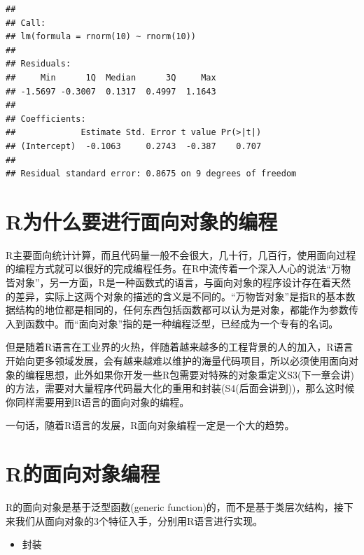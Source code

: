 \documentclass[]{book}
\providecommand{\tightlist}{%
  \setlength{\itemsep}{0pt}\setlength{\parskip}{0pt}}
\begin{document}
\begin{verbatim}
## 
## Call:
## lm(formula = rnorm(10) ~ rnorm(10))
## 
## Residuals:
##     Min      1Q  Median      3Q     Max 
## -1.5697 -0.3007  0.1317  0.4997  1.1643 
## 
## Coefficients:
##             Estimate Std. Error t value Pr(>|t|)
## (Intercept)  -0.1063     0.2743  -0.387    0.707
## 
## Residual standard error: 0.8675 on 9 degrees of freedom
\end{verbatim}

\section{R为什么要进行面向对象的编程}\label{r}

R主要面向统计计算，而且代码量一般不会很大，几十行，几百行，使用面向过程的编程方式就可以很好的完成编程任务。在R中流传着一个深入人心的说法``万物皆对象''，另一方面，R是一种函数式的语言，与面向对象的程序设计存在着天然的差异，实际上这两个对象的描述的含义是不同的。``万物皆对象''是指R的基本数据结构的地位都是相同的，任何东西包括函数都可以认为是对象，都能作为参数传入到函数中。而``面向对象''指的是一种编程泛型，已经成为一个专有的名词。

但是随着R语言在工业界的火热，伴随着越来越多的工程背景的人的加入，R语言开始向更多领域发展，会有越来越难以维护的海量代码项目，所以必须使用面向对象的编程思想，此外如果你开发一些R包需要对特殊的对象重定义S3(下一章会讲)的方法，需要对大量程序代码最大化的重用和封装(S4(后面会讲到))，那么这时候你同样需要用到R语言的面向对象的编程。

一句话，随着R语言的发展，R面向对象编程一定是一个大的趋势。

\section{R的面向对象编程}\label{r}

R的面向对象是基于泛型函数(generic
function)的，而不是基于类层次结构，接下来我们从面向对象的3个特征入手，分别用R语言进行实现。

\begin{itemize}
\tightlist
\item
  封装
\end{itemize}
\end{document}
